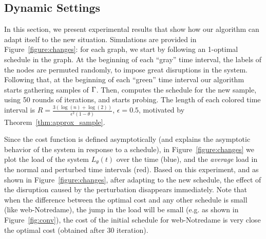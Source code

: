 
\subsection{Dynamic Settings}\label{sec:dynset}
In this section, we present experimental results that show
 how our algorithm can adapt itself to the new situation.
Simulations are provided in Figure~\ref{figure:changes}: for each graph, we
start by following an 1-optimal schedule in the graph. At the beginning of each
``gray'' time interval, the labels of the nodes are permuted randomly, to impose
great disruptions in the system. Following that, at
the beginning of each ``green'' time interval our algorithm starts gathering
samples of $\Gamma$. Then, \algonameapx computes the schedule for the new sample, using 50 rounds of iterations, and starts probing. The length of each colored time
interval is $R = \frac{3(\log(n)+\log(2))}{\epsilon^2(1-\theta)}$, $\epsilon=0.5$, motivated by
Theorem~\ref{thm:approx_sample}.



Since the cost function is defined asymptotically (and explains the asymptotic behavior of the system in response to a schedule), in  Figure~\ref{figure:changes} we plot the load of the system $L_\theta(t)$ over the time (blue), and the \emph{average} load in the normal and perturbed time intervals (red). Based on this experiment, and as shown in Figure~\ref{figure:changes}, after adapting to the new schedule, the effect of the disruption caused by the perturbation disappears immediately. Note that when the difference between the optimal cost and any other schedule is small (like web-Notredame), the jump in the load will be small (e.g. as shown in Figure~\ref{fig:conv}), the cost of the initial schedule for web-Notredame is very close the optimal cost (obtained after 30 iteration).

